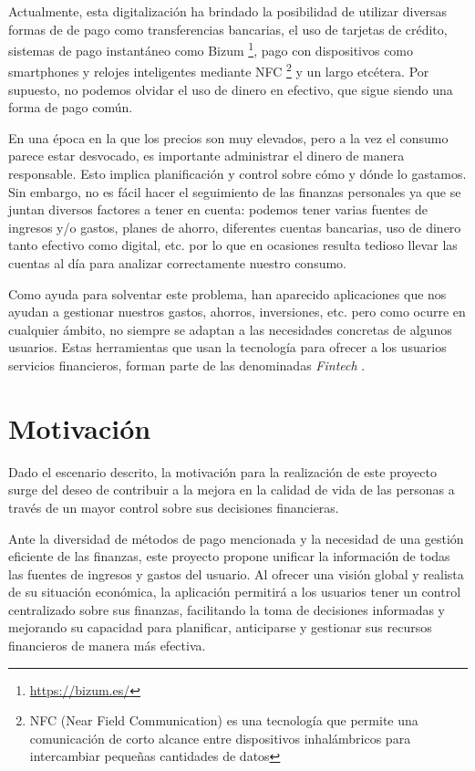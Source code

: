 Actualmente, esta digitalización ha brindado la posibilidad de utilizar diversas formas de de pago como transferencias bancarias, el uso de tarjetas de crédito, sistemas de pago instantáneo como Bizum \footnote{\url{https://bizum.es/}}, pago con dispositivos como smartphones y relojes inteligentes mediante NFC \footnote{NFC (Near Field Communication) es una tecnología que permite una comunicación de corto alcance entre dispositivos inhalámbricos para intercambiar pequeñas cantidades de datos} y un largo etcétera. Por supuesto, no podemos olvidar el uso de dinero en efectivo, que sigue siendo una forma de pago común. 

En una época en la que los precios son muy elevados, pero a la vez el consumo parece estar desvocado, es importante administrar el dinero de manera responsable. Esto implica planificación y control sobre cómo y dónde lo gastamos.
Sin embargo, no es fácil hacer el seguimiento de las finanzas personales ya que se 
juntan diversos factores a tener en cuenta: podemos tener varias fuentes de ingresos y/o 
gastos, planes de ahorro, diferentes cuentas bancarias, uso de dinero tanto 
efectivo como digital, etc. por lo que en ocasiones resulta tedioso 
llevar las cuentas al día para analizar correctamente nuestro consumo.

Como ayuda para solventar este problema, han aparecido aplicaciones que nos ayudan a gestionar nuestros gastos, ahorros, inversiones, etc. pero como ocurre en cualquier ámbito, no siempre se adaptan a las necesidades concretas de algunos usuarios. Estas herramientas que usan la tecnología para ofrecer a los usuarios servicios financieros, forman parte de las denominadas \textit{Fintech} \cite{schueffel2016taming}.

\section{Motivación}
Dado el escenario descrito, la motivación para la realización de este proyecto surge del deseo de contribuir a la mejora en la calidad de vida de las personas a través de un mayor control sobre sus decisiones financieras. 

Ante la diversidad de métodos de pago mencionada y la necesidad de una gestión eficiente de las finanzas, este proyecto propone unificar la información de todas las fuentes de ingresos y gastos del usuario. Al ofrecer una visión global y realista de su situación económica, la aplicación permitirá a los usuarios tener un control centralizado sobre sus finanzas, facilitando la toma de decisiones informadas y mejorando su capacidad para planificar, anticiparse y gestionar sus recursos financieros de manera más efectiva.\\

